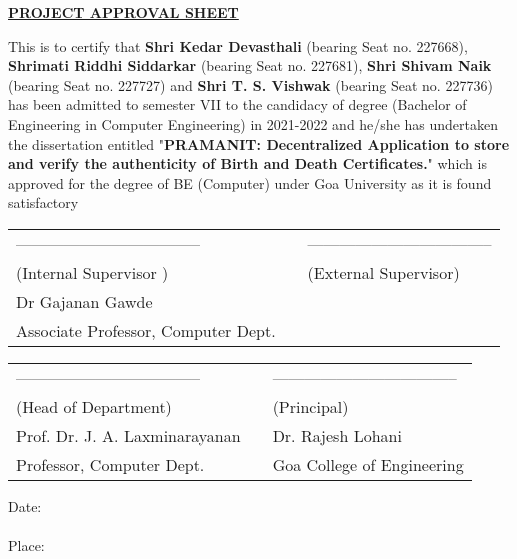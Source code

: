 \begin{center}
\underline{\bfseries \huge PROJECT APPROVAL SHEET}\\
\vspace{1cm}
\end{center}
\noindent This is to certify that \textbf{Shri Kedar Devasthali} (bearing Seat no. 227668), \textbf{Shrimati Riddhi Siddarkar} (bearing Seat no. 227681), \textbf{Shri Shivam Naik} (bearing Seat no. 227727) and \textbf{Shri T. S. Vishwak} (bearing Seat no. 227736) has been admitted to semester VII to the candidacy of degree (Bachelor of Engineering in Computer Engineering) in 2021-2022 and he/she has undertaken the dissertation entitled "\textbf{PRAMANIT: Decentralized Application to store and verify the authenticity of Birth and Death Certificates.}" which is approved for the degree of BE (Computer) under Goa University as it is found satisfactory

\vspace{2.8cm}

\begin{table}[H]
	\begin{center}
\begin{tabular}{lcl}
	\noindent ----------------------------------- &\hspace{1cm}&  ----------------------------------- \\
	(Internal Supervisor ) & \hspace{3cm} & (External Supervisor) \\
Dr Gajanan Gawde & \hspace{3cm}   \\
Associate Professor, Computer Dept. & \hspace{3cm}  \\
\end{tabular}
\end{center}
\end{table}

\vspace{2.5cm}

\begin{table}[H]
	\begin{center}
		\begin{tabular}{lcl}
			\noindent ----------------------------------- &\hspace{1cm}&  ----------------------------------- \\
		(Head of Department) & \hspace{3cm} & (Principal) \\
		Prof. Dr. J. A. Laxminarayanan & \hspace{3cm} &Dr. Rajesh Lohani \\
		Professor, Computer Dept. & \hspace{3cm} & Goa College of Engineering \\
		\end{tabular}
		\end{center}
\end{table}

\vspace{2cm}

\noindent Date: \\
\\
\noindent Place: \\


